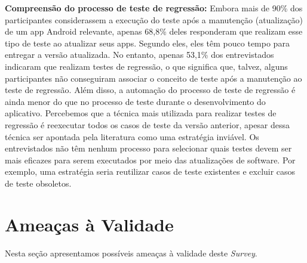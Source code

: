 \textbf{Compreensão do processo de teste de regressão:} Embora mais de 90\% dos participantes considerassem a execução do teste após a manutenção (atualização) de um app Android relevante, apenas 68,8\% deles responderam que realizam esse tipo de teste ao atualizar seus apps. Segundo eles, eles têm pouco tempo para entregar a versão atualizada. No entanto, apenas 53,1\% dos entrevistados indicaram que realizam testes de regressão, o que significa que, talvez, alguns participantes não conseguiram associar o conceito de teste após a manutenção ao teste de regressão. Além disso, a automação do processo de teste de regressão é ainda menor do que no processo de teste durante o desenvolvimento do aplicativo. Percebemos que a técnica mais utilizada para realizar testes de regressão é reexecutar todos os casos de teste da versão anterior, apesar dessa técnica ser apontada pela literatura como uma estratégia inviável. Os entrevistados não têm nenhum processo para selecionar quais testes devem ser mais eficazes para serem executados por meio das atualizações de software. Por exemplo, uma estratégia seria reutilizar casos de teste existentes e excluir casos de teste obsoletos.

\section{Ameaças à Validade}\label{threatstovalidity}

Nesta seção apresentamos possíveis ameaças à validade deste \textit{Survey}.


